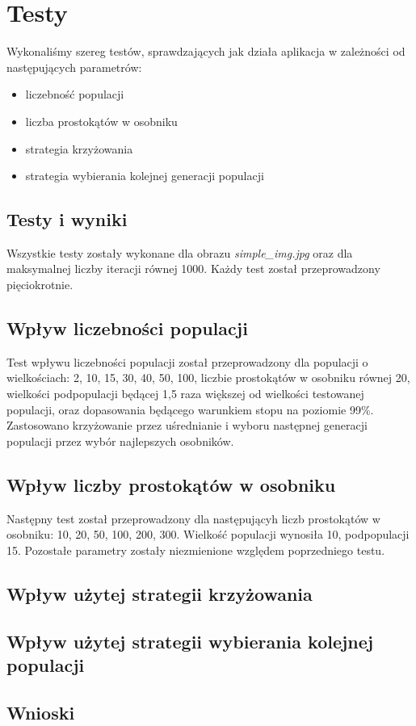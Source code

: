 \documentclass{article}
\begin{document}
\section{Testy}
Wykonaliśmy szereg testów, sprawdzających jak działa aplikacja w zależności od następujących parametrów:
\begin{itemize}
    \item liczebność populacji
    \item liczba prostokątów w osobniku
    \item strategia krzyżowania
    \item strategia wybierania kolejnej generacji populacji
\end{itemize}
\subsection{Testy i wyniki}
Wszystkie testy zostały wykonane dla obrazu {\it simple\_img.jpg} oraz dla maksymalnej liczby iteracji równej 1000. Każdy test został przeprowadzony pięciokrotnie. 
\subsection*{Wpływ liczebności populacji}
Test wpływu liczebności populacji został przeprowadzony dla populacji o wielkościach: 2, 10, 15, 30, 40, 50, 100, liczbie prostokątów w osobniku równej 20, wielkości podpopulacji będącej 1,5 raza większej od wielkości testowanej populacji, oraz dopasowania będącego warunkiem stopu na poziomie 99\%. Zastosowano krzyżowanie przez uśrednianie i wyboru następnej generacji populacji przez wybór najlepszych osobników.  
\subsection*{Wpływ liczby prostokątów w osobniku}
Następny test został przeprowadzony dla następującyh liczb prostokątów w osobniku: 10, 20, 50, 100, 200, 300. Wielkość populacji wynosiła 10, podpopulacji 15. Pozostałe parametry zostały niezmienione względem poprzedniego testu. 
\subsection*{Wpływ użytej strategii krzyżowania}
\subsection*{Wpływ użytej strategii wybierania kolejnej populacji}
\subsection{Wnioski}
\end{document}
